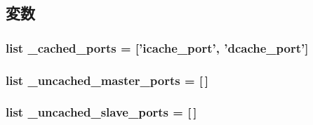 \subsection{変数}
\hypertarget{classBaseCPU_a466be9cc0cce279e1a60edb036677ef9}{
\subsubsection[{\_\-cached\_\-ports}]{}}
\label{classBaseCPU_a466be9cc0cce279e1a60edb036677ef9}
\hypertarget{classBaseCPU_a57e86fee16346e0c872def95c935bfea}{
\subsubsection[{\_\-cached\_\-ports}]{\setlength{\rightskip}{0pt plus 5cm}list {\bf \_\-cached\_\-ports} = \mbox{[}'{\bf icache\_\-port}', '{\bf dcache\_\-port}'\mbox{]}}}
\label{classBaseCPU_a57e86fee16346e0c872def95c935bfea}
\hypertarget{classBaseCPU_aa1ea0760d8eaf6d9205060618f4ba032}{
\subsubsection[{\_\-uncached\_\-master\_\-ports}]{\setlength{\rightskip}{0pt plus 5cm}list {\bf \_\-uncached\_\-master\_\-ports} = \mbox{[}$\,$\mbox{]}}}
\label{classBaseCPU_aa1ea0760d8eaf6d9205060618f4ba032}
\hypertarget{classBaseCPU_a84566b9e98570dae181d316412668254}{
\subsubsection[{\_\-uncached\_\-slave\_\-ports}]{\setlength{\rightskip}{0pt plus 5cm}list {\bf \_\-uncached\_\-slave\_\-ports} = \mbox{[}$\,$\mbox{]}}}
\label{classBaseCPU_a84566b9e98570dae181d316412668254}


